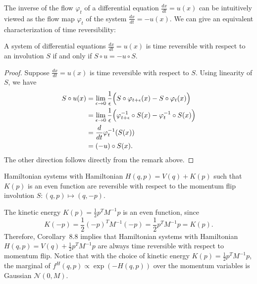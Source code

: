 The inverse of the flow $\varphi_t$ of a differential equation $\frac{dx}{dt} = u(x)$ can be
intuitively viewed as the flow map $\varphi_t$ of the system $\frac{dx}{dt} = -u(x)$. We can
give an equivalent characterization of time reversibility:

\begin{theorem}
A system of differential equations $\frac{dx}{dt} = u(x)$ is time reversible with respect to
an involution $S$ if and only if $S \circ u = -u \circ S$.
\end{theorem}

\begin{proof}
Suppose $\frac{dx}{dt} = u(x)$ is time reversible with respect to $S$. Using linearity of
$S$, we have
\begin{align*}
S \circ u(x)
&= \lim_{\epsilon \to 0} \frac{1}{\epsilon}
  \Bigl(S \circ \varphi_{t+\epsilon}(x) - S \circ \varphi_t(x)\Bigr) \\
&= \lim_{\epsilon \to 0} \frac{1}{\epsilon}
  \Bigl(\varphi_{t+\epsilon}^{-1} \circ S(x) - \varphi_t^{-1} \circ S(x)\Bigr) \\
&= \frac{d}{dt}\varphi_t^{-1}\!\left(S(x)\right) \\
&= (-u) \circ S(x).
\end{align*}
The other direction follows directly from the remark above.
\end{proof}

\begin{corollary}
Hamiltonian systems with Hamiltonian $H(q,p) = V(q) + K(p)$ such that $K(p)$ is an even
function are reversible with respect to the momentum flip involution
$S : (q,p) \mapsto (q,-p)$.
\end{corollary}

\begin{example}
The kinetic energy $K(p) = \frac{1}{2}p^T M^{-1} p$ is an even function, since
\[
K(-p) = \frac{1}{2}(-p)^T M^{-1}(-p) = \frac{1}{2}p^T M^{-1} p = K(p).
\]
Therefore, Corollary~8.8 implies that Hamiltonian systems with Hamiltonian
$H(q,p) = V(q) + \frac{1}{2}p^T M^{-1}p$ are always time reversible with respect to
momentum flip. Notice that with the choice of kinetic energy $K(p) = \frac{1}{2}p^T M^{-1}p$,
the marginal of $f^H(q,p) \propto \exp(-H(q,p))$ over the momentum variables is
Gaussian $\mathcal{N}(0, M)$.
\end{example}
